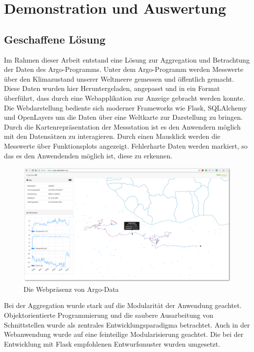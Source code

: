\section{Demonstration und Auswertung}


\subsection{Geschaffene Lösung}

Im Rahmen dieser Arbeit entstand eine Lösung zur Aggregation und Betrachtung der Daten des Argo-Programms. Unter dem Argo-Programm werden Messwerte über den Klimazustand unserer Weltmeere gemessen und öffentlich gemacht. Diese Daten wurden hier Heruntergeladen, angepasst und in ein Format überführt, dass durch eine Webapplikation zur Anzeige gebracht werden konnte. Die Webdarstellung bediente sich moderner Frameworks wie Flask, SQLAlchemy und OpenLayers um die Daten über eine Weltkarte zur Darstellung zu bringen. Durch die Kartenrepräsentation der Messstation ist es den Anwendern möglich mit den Datensätzen zu interagieren. Durch einen Mausklick werden die Messwerte über Funktionsplots angezeigt.  Fehlerharte Daten werden markiert, so das es den Anwendenden möglich ist, diese zu erkennen.

\begin{figure}[H]
 \centering
 \includegraphics[width=\textwidth]{pix/argodata_complete.png}
 \caption{Die Webpräsenz von Argo-Data}
 \label{fig:argodataWeb}
\end{figure}

Bei der Aggregation wurde stark auf die Modularität der Anwendung geachtet. Objektorientierte Programmierung und die saubere Ausarbeitung von Schnittstellen wurde als zentrales Entwicklungsparadigma betrachtet. Auch in der Webanwendung wurde auf eine feinteilige Modularisierung geachtet. Die bei der Entwicklung mit Flask empfohlenen Entwurfsmuster wurden umgesetzt. 


